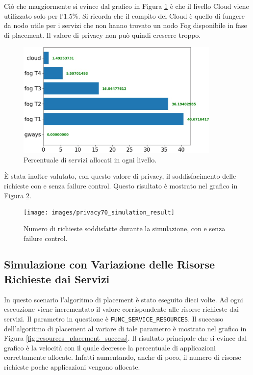 Ciò che maggiormente si evince dal grafico in Figura \ref{fig:privacy_placement_per_level} è che il livello Cloud viene utilizzato solo per l'1.5\%. Si ricorda che il compito del Cloud è quello di fungere da nodo utile per i servizi che non hanno trovato un nodo Fog disponibile in fase di placement. Il valore di privacy non può quindi crescere troppo.

\begin{figure}[!ht]
  \includegraphics[width=10cm]{images/privacy_placement_per_level}
  \centering
  \caption{Percentuale di servizi allocati in ogni livello.}
  \label{fig:privacy_placement_per_level}
\end{figure}

È stata inoltre valutato, con questo valore di privacy, il soddisfacimento delle richieste con e senza failure control. Questo risultato è mostrato nel grafico in Figura \ref{fig:privacy70_simulation_result}.

\begin{figure}[!ht]
  \texttt{[image: images/privacy70\_simulation\_result]}
  \centering
  \caption{Numero di richieste soddisfatte durante la simulazione, con e senza failure control.}
  \label{fig:privacy70_simulation_result}
\end{figure}

\subsection{Simulazione con Variazione delle Risorse Richieste dai Servizi}

In questo scenario l'algoritmo di placement è stato eseguito dieci volte. Ad ogni esecuzione viene incrementato il valore corrispondente alle risorse richieste dai servizi. Il parametro in questione è \texttt{FUNC\_SERVICE\_RESOURCES}. Il successo dell'algoritmo di placement al variare di tale parametro è mostrato nel grafico in Figura \ref{fig:resources_placement_success}. Il risultato principale che si evince dal grafico è la velocità con il quale decresce la percentuale di applicazioni correttamente allocate. Infatti aumentando, anche di poco, il numero di risorse richieste poche applicazioni vengono allocate.

